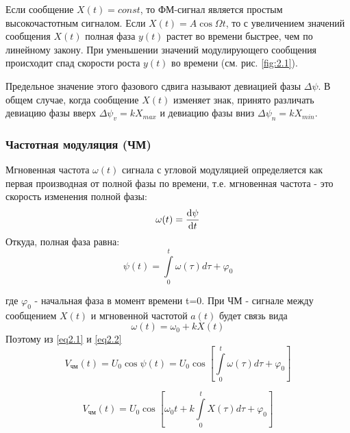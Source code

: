 \documentclass[a4paper,12pt]{article}
\renewcommand{\phi}{\varphi}
\begin{document}
Если сообщение $X(t)=const$, то ФМ-сигнал является простым высокочастотным сигналом.
Если $X(t)=A\cos\Omega t$, то с увеличением значений сообщения $X(t)$ полная фаза $y(t)$ растет во времени быстрее, чем по линейному закону. При уменьшении значений модулирующего сообщения происходит спад скорости роста $y(t)$ во времени (см. рис. \ref{fig:2.1}).



Предельное значение этого фазового сдвига называют девиацией фазы $\Delta \psi$. В общем случае, когда сообщение $X(t)$ изменяет знак, принято различать девиацию фазы вверх $\Delta \psi_v =kX_{max}$ и девиацию фазы вниз $\Delta \psi_n =kX_{min}$.

\subsubsection{Частотная модуляция (ЧМ)}
Мгновенная частота $\omega(t)$ сигнала с угловой модуляцией определяется как первая производная от полной фазы по времени, т.е. мгновенная частота - это скорость изменения полной фазы:
\begin{gather}
	\omega (t)=\dv{\psi}{t}
\end{gather}
Откуда, полная фаза равна:
\begin{equation}
	\label{eq2.1}
	\psi(t)=\int\limits_{0}^{t} \omega(\tau) d \tau+\varphi_{0}
\end{equation}

где $\phi_0$ - начальная фаза в момент времени t=0.
При ЧМ - сигнале между сообщением $X(t)$ и мгновенной частотой $a(t)$ будет связь
вида
\begin{equation}
	\label{eq2.2}
	\omega(t)=\omega_{0}+k X(t)
\end{equation}
Поэтому из \eqref{eq2.1} и \eqref{eq2.2}
\begin{equation}
	V_\text{чм}(t)=U_{0} \cos \psi(t)=U_{0} \cos \left[\int\limits_{0}^{t} \omega(\tau) d \tau+\varphi_{0}\right]
\end{equation}


\begin{equation}
	V_\text{чм}(t)=U_{0} \cos \left[\omega_{0} t+k \int\limits_{0}^{t} X(\tau) d \tau+\varphi_{0}\right]
\end{equation}
\end{document}
